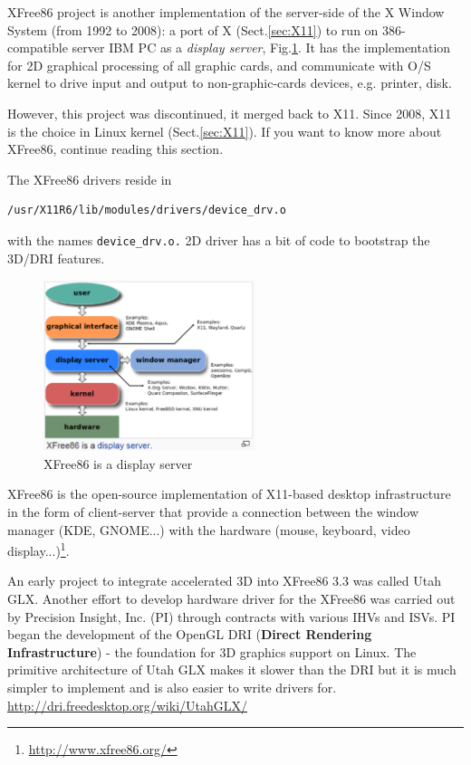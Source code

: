 XFree86 project  is another implementation of the server-side of the X Window
System (from 1992 to 2008): a port of X (Sect.\ref{sec:X11}) to run on
386-compatible server IBM PC as a {\it display server}, Fig.\ref{fig:XFree86}.
It has the implementation for 2D graphical processing of all graphic cards, and
communicate with O/S kernel to drive input and output to non-graphic-cards
devices, e.g. printer, disk.


However, this project was discontinued, it merged back to X11. Since 2008, X11
is the choice in Linux kernel (Sect.\ref{sec:X11}). If you want to know more
about XFree86, continue reading this section.

The XFree86 drivers reside in 
\begin{verbatim}
/usr/X11R6/lib/modules/drivers/device_drv.o 
\end{verbatim}
with the names \verb!device_drv.o.!
2D driver has a bit of code to bootstrap the 3D/DRI features.

\begin{figure}[hbt]
  \centerline{\includegraphics[height=5cm,
    angle=0]{./images/XFree86.eps}}
\caption{XFree86 is a display server}
\label{fig:XFree86}
\end{figure}

\begin{framed}
  XFree86 is the open-source implementation of X11-based desktop
  infrastructure in the form of client-server that provide a
  connection between the window manager (KDE, GNOME...) with the
  hardware (mouse, keyboard, video
  display...)\footnote{\url{http://www.xfree86.org/}}. 
\end{framed}

An early project to integrate accelerated 3D into XFree86 3.3 was called Utah
GLX. Another effort to develop hardware driver for the XFree86 was carried out
by Precision Insight, Inc. (PI) through contracts with various IHVs and ISVs. PI
began the development of the OpenGL DRI ({\bf Direct Rendering Infrastructure})
- the foundation for 3D graphics support on Linux.
The primitive architecture of Utah GLX makes it slower than the DRI but it is
much simpler to implement and is also easier to write drivers for.
\url{http://dri.freedesktop.org/wiki/UtahGLX/} 

